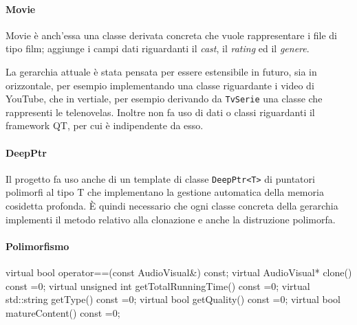 \paragraph{Movie}
Movie è anch'essa una classe derivata concreta che vuole rappresentare i file di tipo film; aggiunge i campi dati riguardanti il \textit{cast}, il \textit{rating} ed il \textit{genere}. \newline

La gerarchia attuale è stata pensata per essere estensibile in futuro, sia in orizzontale, per esempio implementando una classe riguardante i video di YouTube, che in vertiale, per esempio derivando da \texttt{TvSerie} una classe che rappresenti le telenovelas. \newline
Inoltre non fa uso di dati o classi riguardanti il framework QT, per cui è indipendente da esso.

\paragraph{DeepPtr}
Il progetto fa uso anche di un template di classe \texttt{DeepPtr<T>} di puntatori polimorfi al tipo T che implementano la gestione automatica della memoria cosidetta profonda. È quindi necessario che ogni classe concreta della gerarchia implementi il metodo relativo alla clonazione e anche la distruzione polimorfa.

\paragraph{Polimorfismo}

virtual bool operator==(const AudioVisual&) const;
virtual AudioVisual* clone() const =0;
virtual unsigned int getTotalRunningTime() const =0;
virtual std::string getType() const =0;
virtual bool getQuality() const =0;
virtual bool matureContent() const =0;

